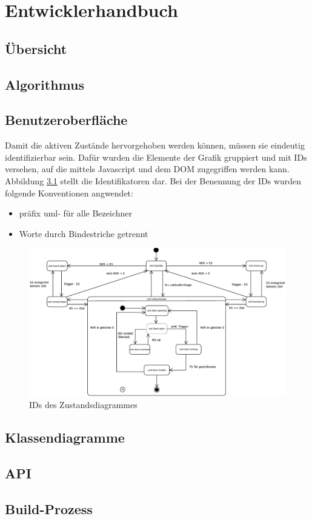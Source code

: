 \part{Entwicklerhandbuch}

\chapter{Übersicht}
\chapter{Algorithmus}
\chapter{Benutzeroberfläche}
Damit die aktiven Zustände hervorgehoben werden können, müssen sie eindeutig identifizierbar sein. Dafür wurden die Elemente der Grafik gruppiert und mit IDs versehen, auf die mittels Javascript und dem \acrshort{DOM} zugegriffen werden kann. Abbildung \ref{fig:ZD_id_view} stellt die Identifikatoren dar. Bei der Benennung der IDs wurden folgende Konventionen angwendet:
\begin{itemize}
 \item präfix uml- für alle Bezeichner
 \item Worte durch Bindestriche getrennt
\end{itemize}

\begin{figure}[hbt]
\centering
\includegraphics[width=\textwidth]{images/ZDv6_id_view.eps}
\caption{IDs des Zustandsdiagrammes}%
\label{fig:ZD_id_view}%
\end{figure}
\chapter{Klassendiagramme}
\chapter{API}
\chapter{Build-Prozess}

